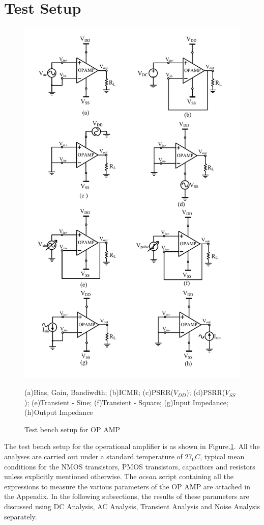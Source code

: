 \section{Test Setup}
\begin{figure} [H]
\centering
\includegraphics[scale=0.75]{Figures/Test_Benches/OPAMP_TB.pdf}
\caption{Test bench setup for OP AMP}
\label{fig:OPAMP_TB}
(a)Bias, Gain, Bandiwdth; (b)ICMR; (c)PSRR($V_{DD}$); (d)PSRR($V_{SS}$); (e)Transient - Sine; (f)Transient - Square; (g)Input Impedance; (h)Output Impedance
\end{figure}

The test bench setup for the operational amplifier is as shown in Figure.\ref{fig:OPAMP_TB}. All the analyses are carried out under a standard temperature of $27_0C$, typical mean conditions for the NMOS transistors, PMOS transistors, capacitors and resistors unless explicitly mentioned otherwise. The $ocean$ script containing all the expressions to measure the various parameters of the OP AMP are attached in the Appendix. In the following subsections, the results of these parameters are discussed using DC Analysis, AC Analysis, Transient Analysis and Noise Analysis separately.

